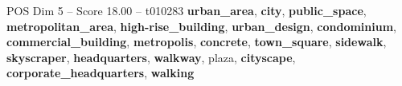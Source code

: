\begin{textsample}{POS Dim 5 – Score 18.00 – t010283}  \label{ex:f5_pos_016}
\textbf{urban\_area}, \textbf{city}, \textbf{public\_space}, \textbf{metropolitan\_area}, \textbf{high-rise\_building}, \textbf{urban\_design}, \textbf{condominium}, \textbf{commercial\_building}, \textbf{metropolis}, \textbf{concrete}, \textbf{town\_square}, \textbf{sidewalk}, \textbf{skyscraper}, \textbf{headquarters}, \textbf{walkway}, plaza, \textbf{cityscape}, \textbf{corporate\_headquarters}, \textbf{walking}

\end{textsample}
